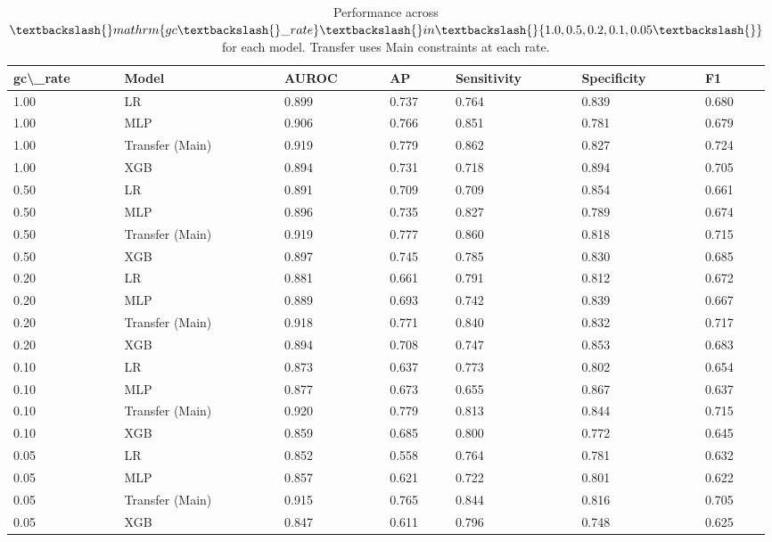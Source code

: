 \documentclass[diagnostics,article,submit,pdftex,moreauthors]{Definitions/mdpi}
\begin{document}
\begin{table}[t]
\centering
\begin{tabular}{lllllll}
\toprule
gc\textbackslash \_rate & Model & AUROC & AP & Sensitivity & Specificity & F1 \\
\midrule
1.00 & LR & 0.899 & 0.737 & 0.764 & 0.839 & 0.680 \\
1.00 & MLP & 0.906 & 0.766 & 0.851 & 0.781 & 0.679 \\
1.00 & Transfer (Main) & 0.919 & 0.779 & 0.862 & 0.827 & 0.724 \\
1.00 & XGB & 0.894 & 0.731 & 0.718 & 0.894 & 0.705 \\
0.50 & LR & 0.891 & 0.709 & 0.709 & 0.854 & 0.661 \\
0.50 & MLP & 0.896 & 0.735 & 0.827 & 0.789 & 0.674 \\
0.50 & Transfer (Main) & 0.919 & 0.777 & 0.860 & 0.818 & 0.715 \\
0.50 & XGB & 0.897 & 0.745 & 0.785 & 0.830 & 0.685 \\
0.20 & LR & 0.881 & 0.661 & 0.791 & 0.812 & 0.672 \\
0.20 & MLP & 0.889 & 0.693 & 0.742 & 0.839 & 0.667 \\
0.20 & Transfer (Main) & 0.918 & 0.771 & 0.840 & 0.832 & 0.717 \\
0.20 & XGB & 0.894 & 0.708 & 0.747 & 0.853 & 0.683 \\
0.10 & LR & 0.873 & 0.637 & 0.773 & 0.802 & 0.654 \\
0.10 & MLP & 0.877 & 0.673 & 0.655 & 0.867 & 0.637 \\
0.10 & Transfer (Main) & 0.920 & 0.779 & 0.813 & 0.844 & 0.715 \\
0.10 & XGB & 0.859 & 0.685 & 0.800 & 0.772 & 0.645 \\
0.05 & LR & 0.852 & 0.558 & 0.764 & 0.781 & 0.632 \\
0.05 & MLP & 0.857 & 0.621 & 0.722 & 0.801 & 0.622 \\
0.05 & Transfer (Main) & 0.915 & 0.765 & 0.844 & 0.816 & 0.705 \\
0.05 & XGB & 0.847 & 0.611 & 0.796 & 0.748 & 0.625 \\
\bottomrule
\end{tabular}

\caption{Performance across $\textbackslash\{\}mathrm\{gc\textbackslash\{\}\_rate\}\textbackslash\{\}in\textbackslash\{\}\{1.0,0.5,0.2,0.1,0.05\textbackslash\{\}\}$ for each model. Transfer uses Main constraints at each rate.}
\label{tab:model-gc-rate-sweep}
\end{table}
\end{document}
